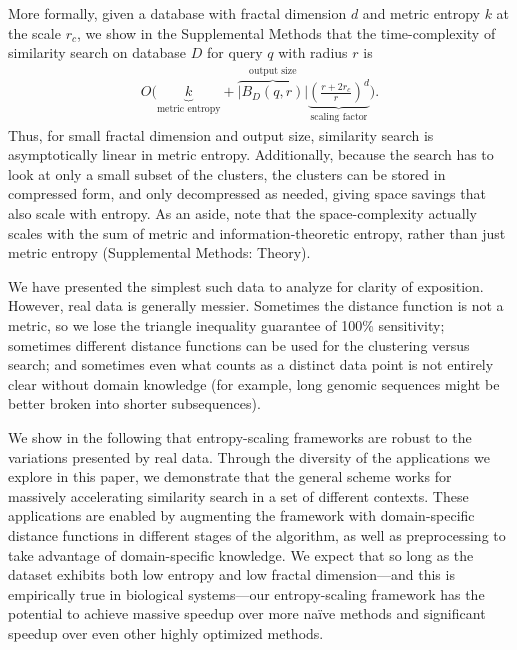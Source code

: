 \documentclass[review,preprint,12pt]{elsarticle}
\theoremstyle{definition}
\theoremstyle{remark}
\numberwithin{equation}{section}
\begin{document}
More formally, given a database with fractal dimension $d$ and metric entropy $k$ at the scale $r_c$, we show in the Supplemental Methods that the time-complexity of similarity search on database $D$ for query $q$ with radius $r$ is
\begin{gather*}
    O\Bigg(
    \underbrace{k}_{\textrm{metric entropy}} +
    \overbrace{\left|B_D(q,r)\right|}^{\textrm{output size}}
    \underbrace{\left(\frac{r+2r_c}{r}\right)^d}_{\textrm{scaling factor}}
     \Bigg) .
\end{gather*}
Thus, for small fractal dimension and output size, similarity search is asymptotically linear in metric entropy.
Additionally, because the search has to look at only a small subset of the clusters, the clusters can be stored in compressed form, and only decompressed as needed, giving space savings that also scale with entropy.
As an aside, note that the space-complexity actually scales with the sum of metric and information-theoretic entropy, rather than just metric entropy 
(Supplemental Methods: Theory).

We have presented the simplest such data to analyze for clarity of exposition.
However, real data is generally messier.
Sometimes the distance function is not a metric, so we lose the triangle inequality guarantee of 100\% sensitivity;
sometimes different distance functions can be used for the clustering versus search;
and sometimes even what counts as a distinct data point is not entirely clear without domain knowledge (for example, long genomic sequences might be better broken into shorter subsequences).

We show in the following that entropy-scaling frameworks are robust to the variations presented by real data.
Through the diversity of the applications we explore in this paper, we demonstrate that the general scheme works for massively accelerating similarity search in a set of different contexts.
These applications are enabled by augmenting the framework with domain-specific distance functions in different stages of the algorithm, as well as preprocessing to take advantage of domain-specific knowledge.
We expect that so long as the dataset exhibits both low entropy and low 
fractal dimension---and this is empirically true in biological systems---our 
entropy-scaling framework has the potential to achieve massive speedup 
over more na\"ive methods and significant speedup over even other highly 
optimized methods.
\end{document}
